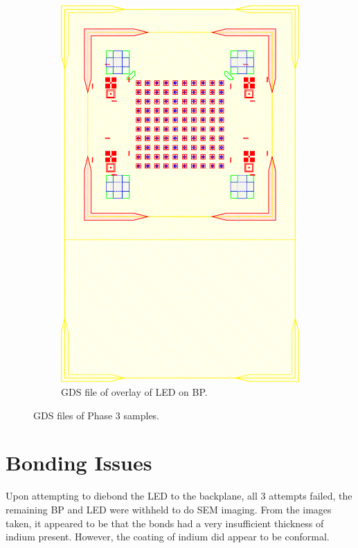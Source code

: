 \begin{figure}
\begin{subfigure}[t]{0.3\textwidth}
        \includegraphics[width=\textwidth]{Main/Ch4/ONOFF_NC_2022_V3.GDS_BOTH.pdf}
        \caption{GDS file of overlay of LED on BP.}
        \label{fig:P3_GDS_BOTH}
    \end{subfigure}
    \caption{GDS files of Phase 3 samples.}
    \label{fig:P3_GDS_All}
\end{figure}

\section{Bonding Issues}

Upon attempting to diebond the LED to the backplane, all 3 attempts failed, the remaining BP and LED were withheld to do SEM imaging. From the images taken, it appeared to be that the bonds had a very insufficient thickness of indium present. However, the coating of indium did appear to be conformal.

